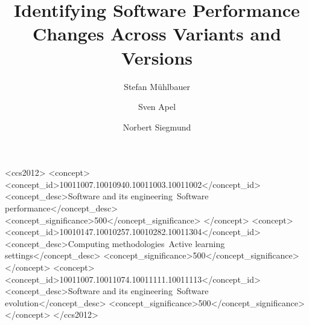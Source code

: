 \documentclass[sigconf]{acmart}
\begin{document}
	
	\title{Identifying Software Performance Changes Across Variants and Versions}
	
	
	\author{Stefan Mühlbauer}
	
	\author{Sven Apel}
	
	\author{Norbert Siegmund}
	
	
	\begin{CCSXML}
		<ccs2012>
		<concept>
		<concept_id>10011007.10010940.10011003.10011002</concept_id>
		<concept_desc>Software and its engineering~Software performance</concept_desc>
		<concept_significance>500</concept_significance>
		</concept>
		<concept>
		<concept_id>10010147.10010257.10010282.10011304</concept_id>
		<concept_desc>Computing methodologies~Active learning settings</concept_desc>
		<concept_significance>500</concept_significance>
		</concept>
		<concept>
		<concept_id>10011007.10011074.10011111.10011113</concept_id>
		<concept_desc>Software and its engineering~Software evolution</concept_desc>
		<concept_significance>500</concept_significance>
		</concept>
		</ccs2012>
	\end{CCSXML}
	
\end{document}
